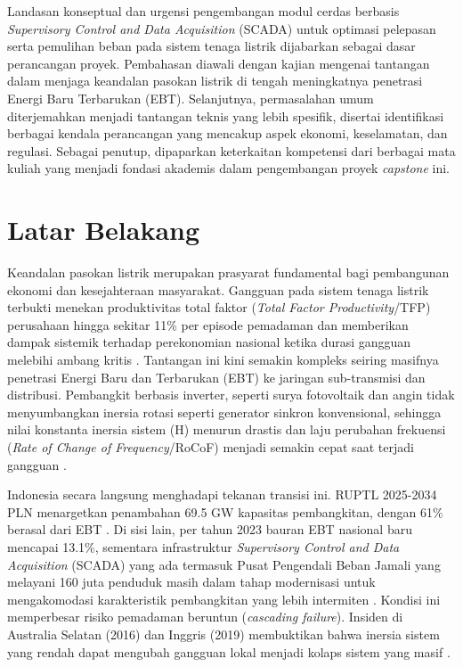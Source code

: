 Landasan konseptual dan urgensi pengembangan modul cerdas berbasis \textit{Supervisory Control and Data Acquisition} (SCADA) untuk optimasi pelepasan serta pemulihan beban pada sistem tenaga listrik dijabarkan sebagai dasar perancangan proyek. Pembahasan diawali dengan kajian mengenai tantangan dalam menjaga keandalan pasokan listrik di tengah meningkatnya penetrasi Energi Baru Terbarukan (EBT). Selanjutnya, permasalahan umum diterjemahkan menjadi tantangan teknis yang lebih spesifik, disertai identifikasi berbagai kendala perancangan yang mencakup aspek ekonomi, keselamatan, dan regulasi. Sebagai penutup, dipaparkan keterkaitan kompetensi dari berbagai mata kuliah yang menjadi fondasi akademis dalam pengembangan proyek \textit{capstone} ini.

\section{Latar Belakang}
\label{sec:Latar_Belakang}

Keandalan pasokan listrik merupakan prasyarat fundamental bagi pembangunan ekonomi dan kesejahteraan masyarakat. Gangguan pada sistem tenaga listrik terbukti menekan produktivitas total faktor (\textit{Total Factor Productivity}/TFP) perusahaan hingga sekitar 11\% per episode pemadaman \cite{Zambrano2026} dan memberikan dampak sistemik terhadap perekonomian nasional ketika durasi gangguan melebihi ambang kritis \cite{Nduhuura2024}. Tantangan ini kini semakin kompleks seiring masifnya penetrasi Energi Baru dan Terbarukan (EBT) ke jaringan sub-transmisi dan distribusi. Pembangkit berbasis inverter, seperti surya fotovoltaik dan angin tidak menyumbangkan inersia rotasi seperti generator sinkron konvensional, sehingga nilai konstanta inersia sistem (H) menurun drastis dan laju perubahan frekuensi (\textit{Rate of Change of Frequency}/RoCoF) menjadi semakin cepat saat terjadi gangguan \cite{Drhorhi2024, Saleem2024}.

Indonesia secara langsung menghadapi tekanan transisi ini. RUPTL 2025-2034 PLN menargetkan penambahan 69.5 GW kapasitas pembangkitan, dengan 61\% berasal dari EBT \cite{PLN2025}. Di sisi lain, per tahun 2023 bauran EBT nasional baru mencapai 13.1\%, sementara infrastruktur \textit{Supervisory Control and Data Acquisition} (SCADA) yang ada termasuk Pusat Pengendali Beban Jamali yang melayani 160 juta penduduk masih dalam tahap modernisasi untuk mengakomodasi karakteristik pembangkitan yang lebih intermiten \cite{IEEFA2024, Ember2025, ETP2023}. Kondisi ini memperbesar risiko pemadaman beruntun (\textit{cascading failure}). Insiden di Australia Selatan (2016) dan Inggris (2019) membuktikan bahwa inersia sistem yang rendah dapat mengubah gangguan lokal menjadi kolaps sistem yang masif \cite{Frontiers2022}.

